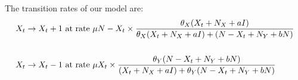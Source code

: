 \documentclass[10pt,a4paper]{article}
\begin{document}
	The transition rates of our model are:
	\begin{align*}\label{def:transition_rates_my_model}
	X_t \rightarrow X_t + 1 & \textnormal{ at rate } \mu N-X_t\times \frac{\theta_X (X_t + N_X + aI)}{\theta_X (X_t + N_X + aI) + (N-X_t + N_Y + bN)} \\
	&\\
	X_t \rightarrow X_t - 1 & \textnormal{ at rate } \mu X_t\times \frac{\theta_Y(N-X_t + N_Y + bN)}{(X_t + N_X + aI) + \theta_Y(N-X_t + N_Y + bN)}
	\end{align*}
	
\end{document}
